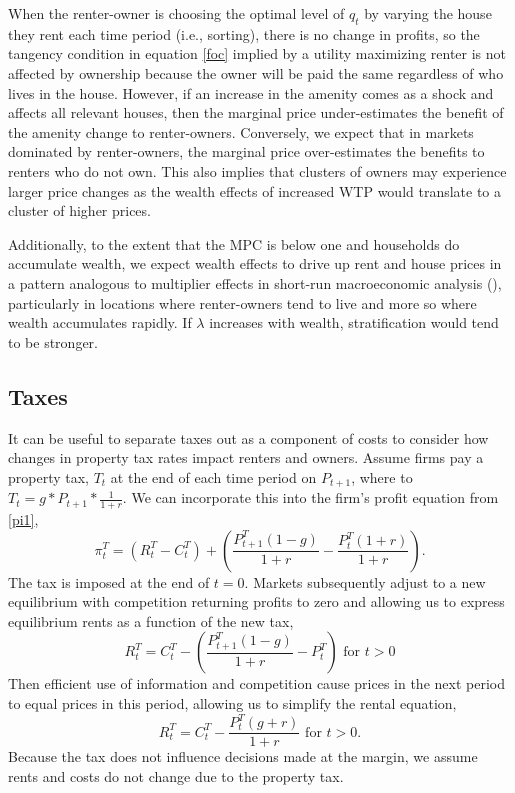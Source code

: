 \documentclass[ecta,nameyear,draft]{econsocart}
\theoremstyle{plain}
\theoremstyle{remark}
\begin{document}
When the renter-owner is choosing the optimal level of $q_t$ by varying the house they rent each time period (i.e., sorting), there is no change in profits, so the tangency condition in equation \ref{foc} implied by a utility maximizing renter is not affected by ownership because the owner will be paid the same regardless of who lives in the house. However, if an increase in the amenity comes as a shock and affects all relevant houses, then the marginal price under-estimates the benefit of the amenity change to renter-owners. Conversely, we expect that in markets dominated by renter-owners, the marginal price over-estimates the benefits to renters who do not own. This also implies that clusters of owners may experience larger price changes as the wealth effects of increased WTP would translate to a cluster of higher prices.

Additionally, to the extent that the MPC is below one and households do accumulate wealth, we expect wealth effects to drive up rent and house prices in a pattern analogous to multiplier effects in short-run macroeconomic analysis (\cite{samuelson39}), particularly in locations where renter-owners tend to live and more so where wealth accumulates rapidly. If $\lambda$ increases with wealth, stratification would tend to be stronger.



\subsection{Taxes}
It can be useful to separate taxes out as a component of costs to consider how changes in property tax rates impact renters and owners. Assume firms pay a property tax, $T_t$ at the end of each time period on $P_{t+1}$, where to $T_t=g*P_{t+1}*\frac{1}{1+r}$. We can incorporate this into the firm's profit equation from \ref{pi1},
\begin{equation*}
	\pi^T_t = (R^T_t-C^T_t)+\left(\frac{P^T_{t+1}(1-g)}{1+r}-\frac{P^T_t(1+r)}{1+r}\right).\label{pi1T}
\end{equation*}
The tax is imposed at the end of $t=0$. Markets subsequently adjust to a new equilibrium with competition returning profits to zero and allowing us to express equilibrium rents as a function of the new tax,
\begin{equation*}
	R^T_t=C^T_t-\left(\frac{P^T_{t+1}(1-g)}{1+r}-P^T_t\right) \text{ for }t>0
\end{equation*}
Then efficient use of information and competition cause prices in the next period to equal prices in this period, allowing us to simplify the rental equation,
\begin{equation*}
R^T_t=C^T_t-\frac{P^T_{t}(g+r)}{1+r}\text{ for }t>0.
\end{equation*}
Because the tax does not influence decisions made at the margin, we assume rents and costs do not change due to the property tax. 
\end{document}
